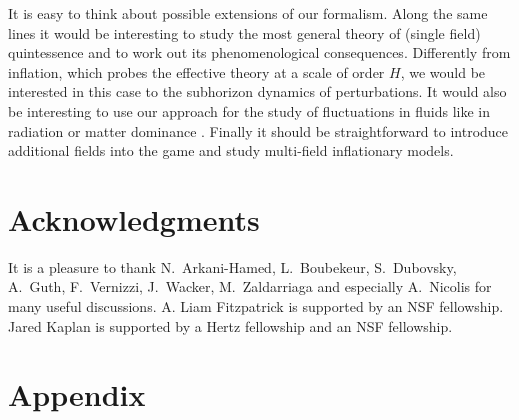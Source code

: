 \documentclass[12pt,letterpaper]{article}
\begin{document}
{It is easy to think about possible extensions of our formalism. Along
the same lines it would be interesting to study the most general
theory of (single field) quintessence and to work out its
phenomenological consequences. Differently from inflation, which
probes the effective theory at a scale of order $H$, we would be
interested in this case to the subhorizon dynamics of perturbations.
It would also be interesting to use our approach for the study of
fluctuations in fluids like in radiation or matter dominance \cite{Dubovsky:2005xd}. Finally it should be
straightforward to introduce additional fields into the game and study
multi-field inflationary models.





\section*{Acknowledgments}
It is a pleasure to thank N.~Arkani-Hamed, L.~Boubekeur, S.~Dubovsky,
A.~Guth, F.~Vernizzi, J.~Wacker, M.~Zaldarriaga and especially A.~Nicolis for many useful discussions.
 A. Liam Fitzpatrick is supported by an NSF fellowship. Jared Kaplan is supported by a Hertz fellowship and an NSF fellowship.


\appendix

\section*{Appendix}

}
\end{document}
